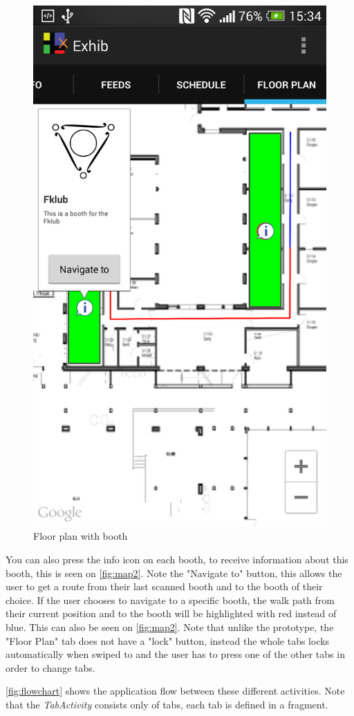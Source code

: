 \begin{figure}[H]
\centering
\includegraphics[width=0.7\columnwidth]{img/finaldesign/map2.png}
\caption{Floor plan with booth}
\label{fig:map2}
\end{figure}

You can also press the info icon on each booth, to receive information about this booth, this is seen on \autoref{fig:map2}. Note the "Navigate to" button, this allows the user to get a route from their last scanned booth and to the booth of their choice. If the user chooses to navigate to a specific booth, the walk path from their current position and to the booth will be highlighted with red instead of blue. This can also be seen on \autoref{fig:map2}. Note that unlike the prototype, the "Floor Plan" tab does not have a "lock" button, instead the whole tabs locks automatically when swiped to and the user has to press one of the other tabs in order to change tabs.

\autoref{fig:flowchart} shows the application flow between these different activities. Note that the \textit{TabActivity} consists only of tabs, each tab is defined in a fragment.

